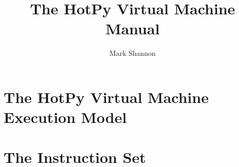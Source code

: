 \documentclass[a4paper,12pt]{report}
\title{The HotPy Virtual Machine Manual}
\author{Mark Shannon}
\date{ }
\begin{document}
\maketitle 

\begin{abstract}

\end{abstract}

\tableofcontents

\chapter{The HotPy Virtual Machine Execution Model\label{chap:vm-model}}



\chapter{The Instruction Set}


\end{document}
